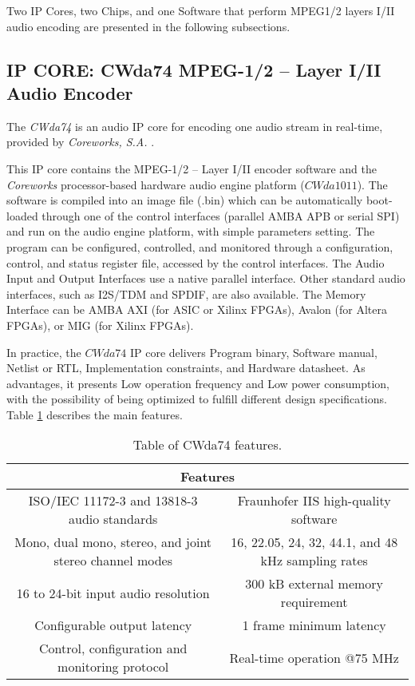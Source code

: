Two IP Cores, two Chips, and one Software that perform MPEG1/2 layers I/II audio encoding are presented in the following subsections.

\subsection{IP CORE: CWda74 MPEG-1/2 – Layer I/II Audio Encoder}

The \textit{CWda74} \cite{CWda74} is an audio IP core for encoding one audio stream in real-time, provided by \textit{Coreworks, S.A.} \cite{coreworks}.

This IP core contains the MPEG-1/2 – Layer I/II encoder software and the \textit{Coreworks} processor-based hardware audio engine platform ($CWda1011$).
The software is compiled into an image file (.bin) which can be automatically boot-loaded through one of the control interfaces (parallel AMBA APB or serial SPI) and run on the audio engine platform, with simple parameters setting.
The program can be configured, controlled, and monitored through a configuration, control, and status register file, accessed by the control interfaces. The Audio Input and Output Interfaces use a native parallel interface. Other standard audio interfaces, such as I2S/TDM and SPDIF, are also available.
The Memory Interface can be AMBA AXI (for ASIC or Xilinx \cite{xilinx} FPGAs), Avalon (for Altera \cite{intel} FPGAs), or MIG (for Xilinx FPGAs).

In practice, the $CWda74$ IP core delivers Program binary, Software manual, Netlist or RTL, Implementation constraints, and Hardware datasheet.
As advantages, it presents Low operation frequency and Low power consumption, with the possibility of being optimized to fulfill different design specifications.
Table \ref{tab:coreworks} describes the main features.

\begin{table}[h]
    \centering
    \begin{tabular}{|c|c|}
        \hline
        \multicolumn{2}{|c|}{\textbf{Features}} \\
        \hline
         ISO/IEC 11172-3 and 13818-3 audio standards & Fraunhofer IIS high-quality software \\
         \hline
         Mono, dual mono, stereo, and joint stereo channel modes & 16, 22.05, 24, 32, 44.1, and 48 kHz sampling rates \\
         \hline
         16 to 24-bit input audio resolution & 300 kB external memory requirement\\
         \hline
         Configurable output latency & 1 frame minimum latency\\
         \hline
         Control, configuration and monitoring protocol & Real-time operation @75 MHz \\
         \hline
    \end{tabular}
    \caption{Table of CWda74 features.}
    \label{tab:coreworks}
\end{table}

